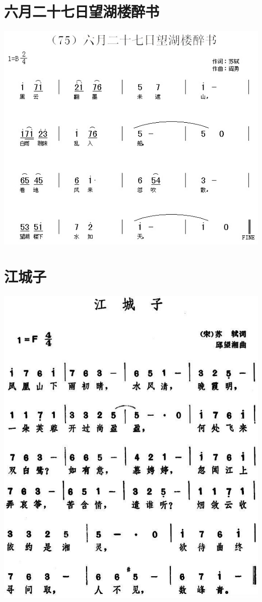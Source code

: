 \documentclass[cn,pad,twocol]{elegantbook}
\begin{document}
\section{六月二十七日望湖楼醉书}    \includegraphics[width=\textwidth]{dongxiao/20200627-苏轼-六月二十七日望湖楼醉书.jpg} 
\section{江城子}                    \includegraphics[width=\textwidth]{dongxiao/20200627-苏轼-江城子.jpg} 
\end{document}

